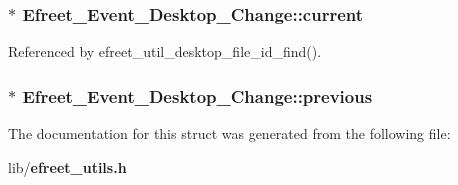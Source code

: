 \subsubsection{$\ast$ {\bf Efreet\_\-Event\_\-Desktop\_\-Change::current}}\label{structEfreet__Event__Desktop__Change_1732552da742db3e07b759bc88adf2e6}




Referenced by efreet\_\-util\_\-desktop\_\-file\_\-id\_\-find().
\subsubsection{$\ast$ {\bf Efreet\_\-Event\_\-Desktop\_\-Change::previous}}\label{structEfreet__Event__Desktop__Change_aae7a44a892edd70b5bc26cd19beced9}




The documentation for this struct was generated from the following file:\begin{CompactItemize}
\item 
lib/{\bf efreet\_\-utils.h}\end{CompactItemize}
